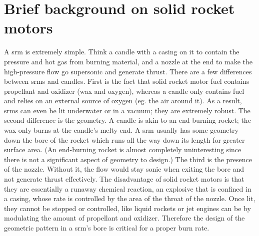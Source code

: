 \section{Brief background on solid rocket motors}

A \gls{srm} is extremely simple. Think a candle with a casing on it to contain the pressure and hot gas from burning material,
and a nozzle at the end to make the high-pressure flow go supersonic and generate thrust.
There are a few differences between \gls{srm}s and candles.
First is the fact that solid rocket motor fuel contains propellant and oxidizer (wax and oxygen),
whereas a candle only contains fuel and relies on an external source of oxygen (eg. the air around it).
As a result, \gls{srm}s can even be lit underwater or in a vacuum;
they are extremely robust. The second difference is the geometry.
A candle is akin to an end-burning rocket; the wax only burns at the candle's melty end.
A \gls{srm} usually has some geometry down the bore of the rocket which runs all the way down its length for greater surface area.
(An end-burning rocket is almost completely uninteresting since there is not a significant aspect of geometry to design.)
The third is the presence of the nozzle. Without it, the flow would stay sonic when exiting the bore and
not generate thrust effectively. The disadvantage of solid rocket motors is that
they are essentially a runaway chemical reaction, an explosive that is confined in a casing,
whose rate is controlled by the area of the throat of the nozzle.
Once lit, they cannot be stopped or controlled, like liquid rockets or jet engines
can be by modulating the amount of propellant and oxidizer.
Therefore the design of the geometric pattern in a \gls{srm}'s bore is critical for a proper burn rate.
